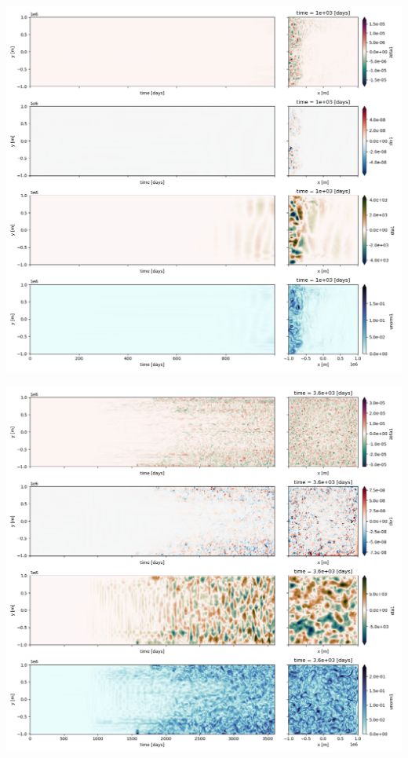 \documentclass[10pt]{article}
\numberwithin{equation}{section}
\begin{document}
\begin{center}
\includegraphics[width=.9\linewidth]{figures/tests/2023-08-14_hovmoller1_t=1000days.png}
\end{center}
\begin{center}
\includegraphics[width=.9\linewidth]{figures/tests/2023-08-14_hovmoller1_t=3600days.png}
\end{center}
\end{document}
